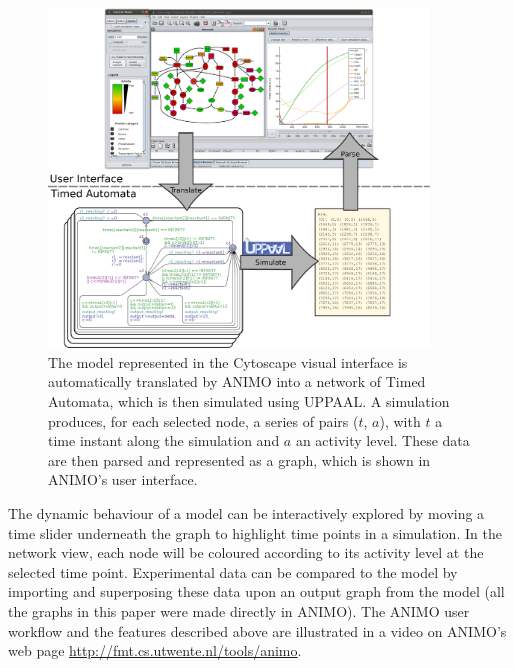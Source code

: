\documentclass{bmcart}
\begin{document}
\begin{figure}[htb]
\begin{center}
\begin{minipage}{\textwidth}
\begin{center}
  \includegraphics[width=0.9\textwidth]{Figures/S1}
\caption{
The model represented in the Cytoscape visual interface is automatically translated by ANIMO
into a network of Timed Automata, which is then simulated using UPPAAL.
A simulation produces, for each selected node, a series of pairs {\sf ($t$, $a$)},
with $t$ a time instant along the simulation and $a$ an activity level. These data are
then parsed and represented as a graph, which is shown in ANIMO's user interface.}\label{fig:animo-sim-workflow}
\end{center}
\end{minipage}
\end{center}
\end{figure}

The dynamic behaviour of a model can be interactively explored by
moving a time slider underneath the graph to highlight time points in a simulation. In the network view,
each node will be coloured according to its activity level at the selected time point.
Experimental data can be compared to the model by importing and superposing these data
upon an output graph from the model (all the graphs in this paper were made directly in ANIMO).
The ANIMO user workflow and the
features described above are illustrated in a video on ANIMO's web page \url{http://fmt.cs.utwente.nl/tools/animo}.
\end{document}
